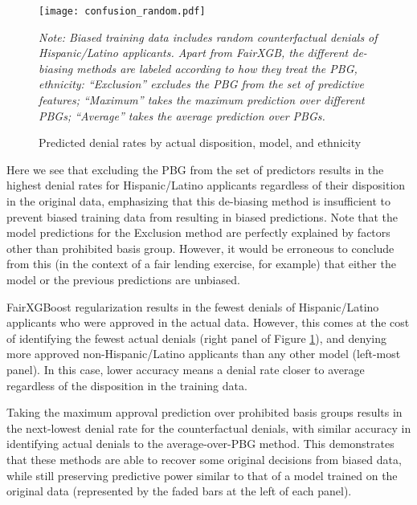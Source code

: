 \begin{figure}[h]
	\centering
	\begin{minipage}{\linewidth}
		\texttt{[image: confusion\_random.pdf]}
		\begin{flushleft}
			\scriptsize{\emph{Note: Biased training data includes random counterfactual denials of Hispanic/Latino applicants. Apart from FairXGB, the different de-biasing methods are labeled according to how they treat the PBG, ethnicity: ``Exclusion'' excludes the PBG from the set of predictive features; ``Maximum'' takes the maximum prediction over different PBGs; ``Average'' takes the average prediction over PBGs.}}
		\end{flushleft}
	\end{minipage}
\caption{Predicted denial rates by actual disposition, model, and ethnicity\label{fig:random}}
\end{figure}

Here we see that excluding the PBG from the set of predictors results in the highest denial rates for Hispanic/Latino applicants regardless of their disposition in the original data, emphasizing that this de-biasing method is insufficient to prevent biased training data from resulting in biased predictions. Note that the model predictions for the Exclusion method are perfectly explained by factors other than prohibited basis group. However, it would be erroneous to conclude from this (in the context of a fair lending exercise, for example) that either the model or the previous predictions are unbiased. 

FairXGBoost regularization results in the fewest denials of Hispanic/Latino applicants who were approved in the actual data. However, this comes at the cost of identifying the fewest actual denials (right panel of Figure \ref{fig:random}), and denying more approved non-Hispanic/Latino applicants than any other model (left-most panel). In this case, lower accuracy means a denial rate closer to average regardless of the disposition in the training data. 

Taking the maximum approval prediction over prohibited basis groups results in the next-lowest denial rate for the counterfactual denials, with similar accuracy in identifying actual denials to the average-over-PBG method. This demonstrates that these methods are able to recover some original decisions from biased data, while still preserving predictive power similar to that of a model trained on the original data (represented by the faded bars at the left of each panel).

